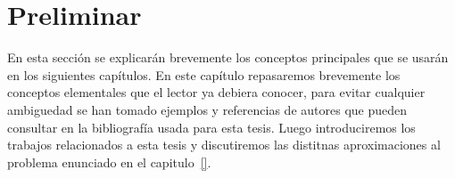 % 
% 
% 
% 
\chapter[Preliminar]{Preliminar}\label{ch:preliminar}

En esta sección se explicarán brevemente los conceptos principales que se usarán en los siguientes capítulos.
En este capítulo repasaremos brevemente los conceptos elementales que el lector ya debiera conocer, para evitar cualquier ambiguedad se han tomado ejemplos y referencias de autores que pueden consultar en la bibliografía usada para esta tesis. Luego introduciremos los trabajos relacionados a esta tesis y discutiremos las distitnas aproximaciones al problema enunciado en el capitulo~\ref{}.

 


